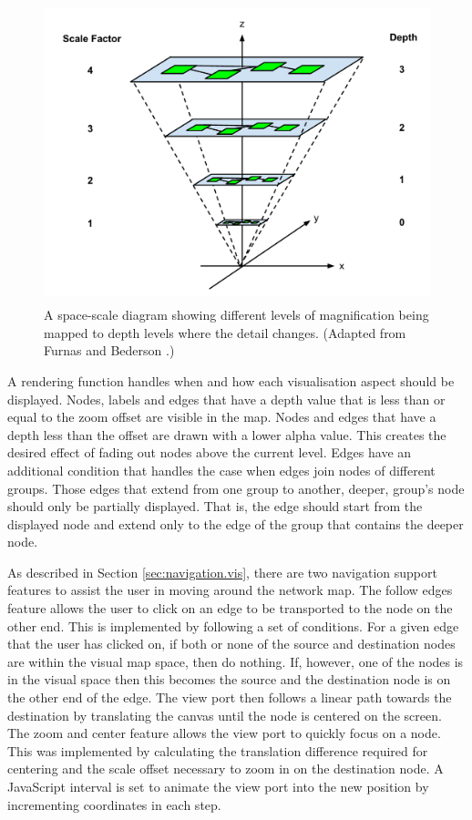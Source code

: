 \documentclass[11pt, a4paper]{report}
\begin{document}
\begin{figure}[h]
\includegraphics[width=120mm,height=87.2mm]{assets/nav2-0.pdf}
\caption{A space-scale diagram showing different levels of magnification being
mapped to depth levels where the detail changes. (Adapted from Furnas and
Bederson \cite{Furnas_1995}.) } 
\label{fig:nav2.0} 
\end{figure}

A rendering function handles when and how each visualisation aspect should be
displayed. Nodes, labels and edges that have a depth value that is less than or
equal to the zoom offset are visible in the map. Nodes and edges that have a
depth less than the offset are drawn with a lower alpha value. This creates the
desired effect of fading out nodes above the current level. Edges have an
additional condition that handles the case when edges join nodes of different
groups. Those edges that extend from one group to another, deeper, group's node
should only be partially displayed. That is, the edge should start from the
displayed node and extend only to the edge of the group that contains the deeper
node.

As described in Section \ref{sec:navigation.vis}, there are two navigation
support features to assist the user in moving around the network map. The follow
edges feature allows the user to click on an edge to be transported to the node
on the other end. This is implemented by following a set of conditions. For a
given edge that the user has clicked on, if both or none of the source and
destination nodes are within the visual map space, then do nothing. If, however,
one of the nodes is in the visual space then this becomes the source and the
destination node is on the other end of the edge. The view port then follows a
linear path towards the destination by translating the canvas until the node is
centered on the screen. The zoom and center feature allows the view port to
quickly focus on a node. This was implemented by calculating the translation
difference required for centering and the scale offset necessary to zoom in on
the destination node. A JavaScript interval is set to animate the view port into
the new position by incrementing coordinates in each step.
\end{document}
